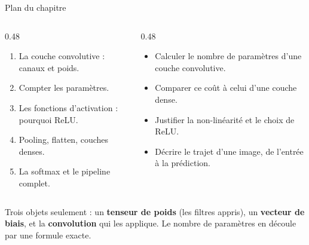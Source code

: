 \begin{frame}{Plan du chapitre}
\begin{columns}[t]
\begin{column}{0.48\textwidth}
\begin{kbox}
\begin{enumerate}
  \item La couche convolutive : canaux et poids.
  \item Compter les paramètres.
  \item Les fonctions d'activation : pourquoi ReLU.
  \item Pooling, flatten, couches denses.
  \item La softmax et le pipeline complet.
\end{enumerate}
\end{kbox}
\end{column}
\begin{column}{0.48\textwidth}
\begin{ebox}
\begin{itemize}
  \item Calculer le nombre de paramètres d'une couche convolutive.
  \item Comparer ce coût à celui d'une couche dense.
  \item Justifier la non-linéarité et le choix de ReLU.
  \item Décrire le trajet d'une image, de l'entrée à la prédiction.
\end{itemize}
\end{ebox}
\end{column}
\end{columns}
\vspace{1mm}
\begin{wbox}
Trois objets seulement : un \textbf{tenseur de poids} (les filtres appris),
un \textbf{vecteur de biais}, et la \textbf{convolution} qui les applique.
Le nombre de paramètres en découle par une formule exacte.
\end{wbox}
\end{frame}

